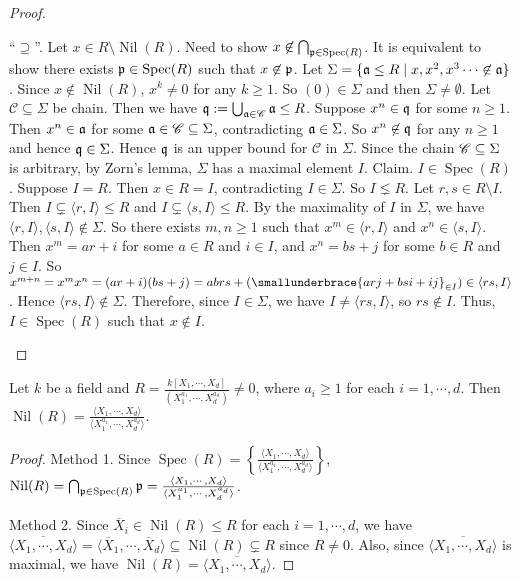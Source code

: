 \begin{proof}
\begin{enumerate}
            ``$\supseteq$''. Let $x \in R \setminus \operatorname{Nil}(R)$. Need to show $x \not \in \bigcap_{\mathfrak{p} \in \operatorname{Spec}(R)}$. It is equivalent to show there exists $\mathfrak{p} \in \operatorname{Spec}(R)$ such that $x \not \in \mathfrak{p}$. Let $\Sigma = \{\mathfrak{a} \leq R \mid x,x^2,x^3 \cdots \not \in \mathfrak{a}\}$. Since $x \not \in \operatorname{Nil}(R)$, $x^k \neq 0$ for any $k \geq 1$. So $(0) \in \Sigma$ and then $\Sigma \neq \emptyset$. Let $\mathscr C \subseteq \Sigma$ be chain. Then we have $\mathfrak{q} := \bigcup_{\mathfrak{a} \in \mathscr C} \mathfrak{a} \leq R$. Suppose $x^n \in \mathfrak{q}$ for some $n \geq 1$. Then $x^n \in \mathfrak{a}$ for some $\mathfrak{a} \in \mathscr C \subseteq \Sigma$, contradicting $\mathfrak{a} \in \Sigma$. So $x^n \not \in \mathfrak{q}$ for any $n \geq 1$ and hence $\mathfrak{q} \in \Sigma$. Hence $\mathfrak{q}$ is an upper bound for $\mathscr C$ in $\Sigma$. Since the chain $\mathscr{C} \subseteq \Sigma$ is arbitrary, by Zorn's lemma, $\Sigma$ has a maximal element $I$. Claim. $I \in \operatorname{Spec}(R)$. Suppose $I = R$. Then $x \in R = I$, contradicting $I \in \Sigma$. So $I \lneq R$. Let $r,s \in R \setminus I$. Then $I \subsetneq \langle r,I \rangle \leq R$ and $I \subsetneq \langle s,I \rangle \leq R$. By the maximality of $I$ in $\Sigma$, we have $\langle r,I \rangle, \langle s,I \rangle \not \in \Sigma$. So there exists $m,n \geq 1$ such that $x^m \in \langle r,I \rangle$ and $x^n \in \langle s,I \rangle$. Then $x^m = ar+i$ for some $a \in R$ and $i \in I$, and $x^n = bs + j$ for some $b \in R$ and $j \in I$. So $x^{m+n} = x^m x^n = (ar+i)(bs+j) = abrs + (\smallunderbrace{arj+bsi+ij}_{\in I}) \in \langle rs,I \rangle$. Hence $\langle rs, I \rangle \not\in \Sigma$. Therefore, since $I \in \Sigma$, we have $I \neq \langle rs,I \rangle$, so $rs \not \in I$. Thus, $I \in \operatorname{Spec}(R)$ such that $x \not \in I$. \qedhere
    \end{enumerate}
\end{proof}

\begin{example*}
    Let $k$ be a field and $R = \frac{k[X_1,\cdots,X_d]}{(X_1^{a_1},\cdots,X_d^{a_d})} \neq 0$, where $a_i \geq 1$ for each $i = 1,\cdots,d$. Then $\operatorname{Nil}(R) = \frac{\langle X_1,\cdots,X_d \rangle}{\langle X_1^{a_1},\cdots,X_d^{a_d} \rangle}$.
\end{example*}

\begin{proof}
    Method 1. Since $\operatorname{Spec}(R) = \left\{\frac{\langle X_1,\cdots,X_d \rangle}{\langle X_1^{a_1},\cdots,X_d^{a_d} \rangle}\right\}$, $\operatorname{Nil}(R) = \bigcap_{\mathfrak{p} \in \operatorname{Spec}(R)} \mathfrak{p} =  \frac{\langle X_1,\cdots,X_d \rangle}{\langle X_1^{a_1},\cdots,X_d^{a_d} \rangle}$. \par
    Method 2. Since $\overbar X_i \in \operatorname{Nil}(R) \leq R$ for each $i = 1,\cdots,d$, we have $\overbar {\langle X_1,\cdots,X_d \rangle} = \langle \overbar X_1,\cdots,\overbar X_d \rangle \subseteq \operatorname{Nil}(R) \subsetneq R$ since $R \neq 0$. Also, since $\overbar {\langle X_1,\cdots,X_d \rangle}$ is maximal, we have $\operatorname{Nil}(R) = \overbar {\langle X_1,\cdots,X_d \rangle}$.
\end{proof}


